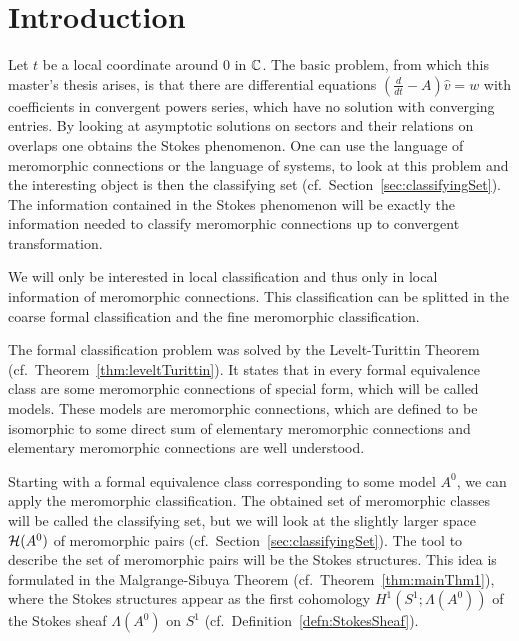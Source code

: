 \chapter{Introduction}
Let $t$ be a local coordinate around $0$ in $\mathbb{C}$.
The basic problem, from which this master's thesis arises, is that there are
differential equations $(\frac{d}{dt}-A)\hat v=w$ with coefficients in
convergent powers series, which have no solution with converging entries.
By looking at asymptotic solutions on sectors and their relations on overlaps
one obtains the Stokes phenomenon.
One can use the language of meromorphic connections or the language of systems,
to look at this problem and the interesting object is then the classifying
set (cf.\ Section~\ref{sec:classifyingSet}).
The information contained in the Stokes phenomenon will be exactly the
information needed to classify meromorphic connections up to convergent
transformation.

We will only be interested in local classification and thus only in local
information of meromorphic connections. This classification can be splitted in
the coarse formal classification and the fine meromorphic classification.

The formal classification problem was solved by the Levelt-Turittin Theorem
(cf.\ Theorem~\ref{thm:leveltTurittin}). It states that in every formal
equivalence class are some meromorphic connections of special form, which will
be called models.
These models are meromorphic connections, which are defined to be isomorphic to
some direct sum of elementary meromorphic connections and elementary
meromorphic connections are well understood.

Starting with a formal equivalence class corresponding to some model $A^0$, we
can apply the meromorphic classification.
The obtained set of meromorphic classes will be called the classifying set, but
we will look at the slightly larger space $\mathcal{H}(A^0)$ of meromorphic pairs
(cf.\ Section~\ref{sec:classifyingSet}).
The tool to describe the set of meromorphic pairs will be the Stokes structures.
This idea is formulated in the Malgrange-Sibuya Theorem
(cf.\ Theorem~\ref{thm:mainThm1}), where the Stokes structures appear as the
first cohomology $H^1(S^1;\Lambda(A^0))$ of the Stokes sheaf
$\Lambda(A^0)$ on $S^1$ (cf.\ Definition~\ref{defn:StokesSheaf}).

